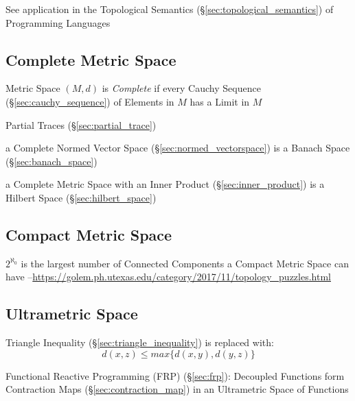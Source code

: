 \fist See application in the Topological Semantics
(\S\ref{sec:topological_semantics}) of Programming Languages



\subsection{Complete Metric Space}\label{sec:complete_metric_space}

Metric Space $(M,d)$ is \emph{Complete} if every Cauchy Sequence
(\S\ref{sec:cauchy_sequence}) of Elements in $M$ has a Limit in $M$

Partial Traces (\S\ref{sec:partial_trace})

a Complete Normed Vector Space (\S\ref{sec:normed_vectorspace}) is a Banach
Space (\S\ref{sec:banach_space})

a Complete Metric Space with an Inner Product (\S\ref{sec:inner_product}) is a
Hilbert Space (\S\ref{sec:hilbert_space})



\subsection{Compact Metric Space}\label{sec:compact_metric_space}

$2^{\aleph_0}$ is the largest number of Connected Components a Compact Metric
Space can have
--\url{https://golem.ph.utexas.edu/category/2017/11/topology_puzzles.html}



\subsection{Ultrametric Space}\label{sec:ultrametric_space}

Triangle Inequality (\S\ref{sec:triangle_inequality}) is replaced
with:
\[
  d(x,z) \leq max\{d(x,y),d(y,z)\}
\]

Functional Reactive Programming (FRP) (\S\ref{sec:frp}): Decoupled
Functions form Contraction Maps (\S\ref{sec:contraction_map}) in an
Ultrametric Space of Functions



